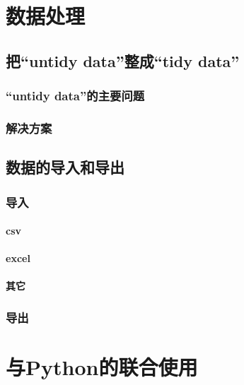 \documentclass[]{book}
\begin{document}
\hypertarget{wrangle}{%
\chapter{数据处理}\label{wrangle}}

\hypertarget{untidy-datatidy-data}{%
\section{把``untidy data''整成``tidy data''}\label{untidy-datatidy-data}}

\hypertarget{untidy-data}{%
\subsection{``untidy data''的主要问题}\label{untidy-data}}

\subsection{解决方案}

\section{数据的导入和导出}

\hypertarget{data-import}{%
\subsection{导入}\label{data-import}}

\hypertarget{csv}{%
\subsubsection{csv}\label{csv}}

\hypertarget{excel}{%
\subsubsection{excel}\label{excel}}

\hypertarget{-2}{%
\subsubsection{其它}\label{-2}}

\subsection{导出}

\hypertarget{python}{%
\chapter{与Python的联合使用}\label{python}}
\end{document}
